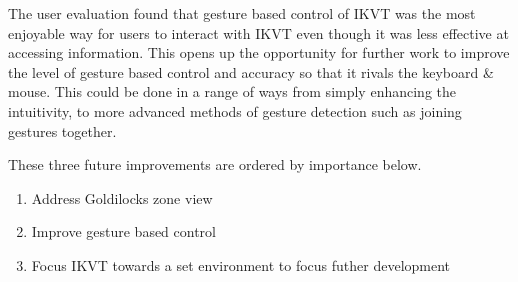 The user evaluation found that gesture based control of IKVT was the most
enjoyable way for users to interact with IKVT even though it was less effective
at accessing information. This opens up the opportunity for further work to
improve the level of gesture based control and accuracy so that it rivals the
keyboard \& mouse. This could be done in a range of ways from simply enhancing
the intuitivity, to more advanced methods of gesture detection such as joining
gestures together.
 
These three future improvements are ordered by importance below.
\begin{enumerate}
 \item Address Goldilocks zone view
 \item Improve gesture based control
 \item Focus IKVT towards a set environment to focus futher development
\end{enumerate}

